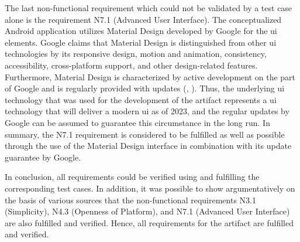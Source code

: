 The last non-functional requirement which could not be validated by a test case alone is the requirement N7.1 (Advanced User Interface). The conceptualized Android application utilizes Material Design developed by Google for the \ac{ui} elements. Google claims that Material Design is distinguished from other \ac{ui} technologies by its responsive design, motion and animation, consistency, accessibility, cross-platform support, and other design-related features. Furthermore, Material Design is characterized by active development on the part of Google and is regularly provided with updates (\cite{Google.2023c}, \cite{Google.2023}). Thus, the underlying \ac{ui} technology that was used for the development of the artifact represents a \ac{ui} technology that will deliver a modern \ac{ui} as of 2023, and the regular updates by Google can be assumed to guarantee this circumstance in the long run. In summary, the N7.1 requirement is considered to be fulfilled as well as possible through the use of the Material Design interface in combination with its update guarantee by Google. 

In conclusion, all requirements could be verified using and fulfilling the corresponding test cases. In addition, it was possible to show argumentatively on the basis of various sources that the non-functional requirements N3.1 (Simplicity), N4.3 (Openness of Platform), and N7.1 (Advanced User Interface) are also fulfilled and verified. Hence, all requirements for the artifact are fulfilled and verified.


